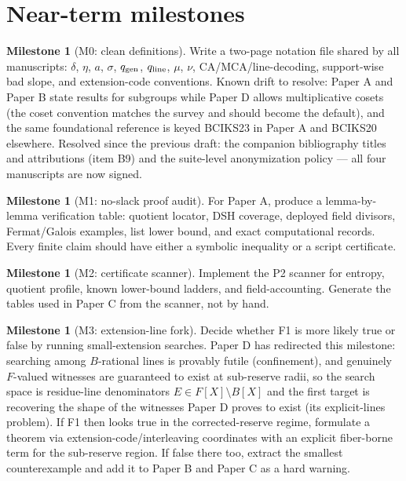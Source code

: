 \documentclass[11pt]{article}
\theoremstyle{definition}
\newtheorem{milestone}[theorem]{Milestone}
\theoremstyle{remark}
\newcommand{\qgen}{q_{\rm gen}}
\newcommand{\qline}{q_{\rm line}}
\newcommand{\paperA}{Paper A}
\newcommand{\paperB}{Paper B}
\newcommand{\paperC}{Paper C}
\newcommand{\paperD}{Paper D}
\begin{document}
\section{Near-term milestones}

\begin{milestone}[M0: clean definitions]
Write a two-page notation file shared by all manuscripts: $\delta$, $\eta$, $a$, $\sigma$, $\qgen$, $\qline$, $\mu$, $\nu$, CA/MCA/line-decoding, support-wise bad slope, and extension-code conventions.  Known drift to resolve: \paperA{} and \paperB{} state results for subgroups while \paperD{} allows multiplicative cosets (the coset convention matches the survey and should become the default), and the same foundational reference is keyed BCIKS23 in \paperA{} and BCIKS20 elsewhere.  Resolved since the previous draft: the companion bibliography titles and attributions (item B9) and the suite-level anonymization policy --- all four manuscripts are now signed.
\end{milestone}

\begin{milestone}[M1: no-slack proof audit]
For \paperA, produce a lemma-by-lemma verification table: quotient locator, DSH coverage, deployed field divisors, Fermat/Galois examples, list lower bound, and exact computational records.  Every finite claim should have either a symbolic inequality or a script certificate.
\end{milestone}

\begin{milestone}[M2: certificate scanner]
Implement the P2 scanner for entropy, quotient profile, known lower-bound ladders, and field-accounting.  Generate the tables used in \paperC{} from the scanner, not by hand.
\end{milestone}

\begin{milestone}[M3: extension-line fork]
Decide whether F1 is more likely true or false by running small-extension searches.  \paperD{} has redirected this milestone: searching among $B$-rational lines is provably futile (confinement), and genuinely $F$-valued witnesses are guaranteed to exist at sub-reserve radii, so the search space is residue-line denominators $E\in F[X]\setminus B[X]$ and the first target is recovering the shape of the witnesses \paperD{} proves to exist (its explicit-lines problem).  If F1 then looks true in the corrected-reserve regime, formulate a theorem via extension-code/interleaving coordinates with an explicit fiber-borne term for the sub-reserve region.  If false there too, extract the smallest counterexample and add it to \paperB{} and \paperC{} as a hard warning.
\end{milestone}
\end{document}
